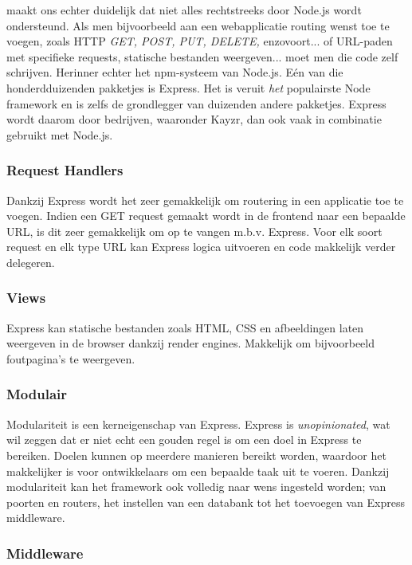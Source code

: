 \textcite{ExpressMozilla} maakt ons echter duidelijk dat niet alles rechtstreeks door Node.js wordt ondersteund. Als men bijvoorbeeld aan een webapplicatie routing wenst toe te voegen, zoals HTTP \textsl{GET, POST, PUT, DELETE,} enzovoort... of URL-paden met specifieke requests, statische bestanden weergeven... moet men die code zelf schrijven. Herinner echter het npm-systeem van Node.js. Eén van die honderdduizenden pakketjes is Express. Het is veruit \textit{het} populairste Node framework en is zelfs de grondlegger van duizenden andere pakketjes. Express wordt daarom door bedrijven, waaronder Kayzr, dan ook vaak in combinatie gebruikt met Node.js.

\subsubsection{Request Handlers}
\label{sec:reqHandlers}

Dankzij Express wordt het zeer gemakkelijk om routering in een applicatie toe te voegen. Indien een GET request gemaakt wordt in de frontend naar een bepaalde URL, is dit zeer gemakkelijk om op te vangen m.b.v. Express. Voor elk soort request en elk type URL kan Express logica uitvoeren en code makkelijk verder delegeren.

\subsubsection{Views}
\label{sec:expressViews}

Express kan statische bestanden zoals HTML, CSS en afbeeldingen laten weergeven in de browser dankzij render engines. Makkelijk om bijvoorbeeld foutpagina's te weergeven.

\subsubsection{Modulair}
\label{sec:expressModularity}

Modulariteit is een kerneigenschap van Express. Express is \textit{unopinionated}, wat wil zeggen dat er niet echt een gouden regel is om een doel in Express te bereiken. Doelen kunnen op meerdere manieren bereikt worden, waardoor het makkelijker is voor ontwikkelaars om een bepaalde taak uit te voeren. Dankzij modulariteit kan het framework ook volledig naar wens ingesteld worden; van poorten en routers, het instellen van een databank tot het toevoegen van Express middleware. 

\subsubsection{Middleware}
\label{sec:expressMiddleware}

